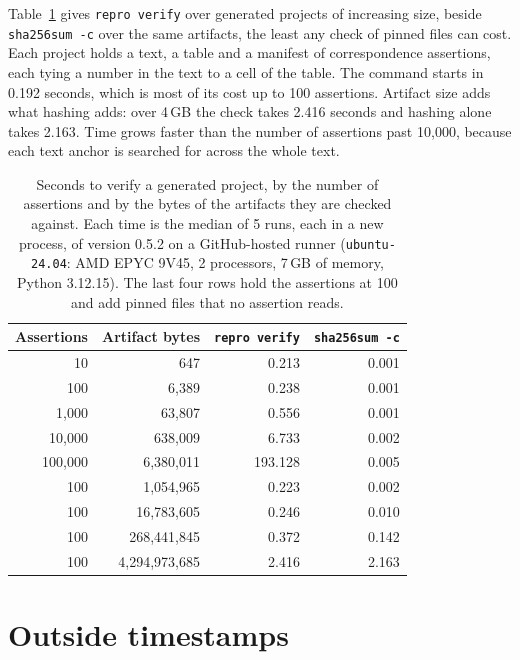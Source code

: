 \documentclass{article}
\newcommand{\code}[1]{\texttt{#1}}
\newcommand{\reproverify}{\code{repro verify}}
\begin{document}
Table~\ref{tab:timing} gives \reproverify{} over generated projects of increasing size, beside
\code{sha256sum -c} over the same artifacts, the least any check of pinned files can cost. Each
project holds a text, a table and a manifest of correspondence assertions, each tying a number in
the text to a cell of the table. The command starts in 0.192 seconds, which is most of its cost
up to 100 assertions. Artifact size adds what hashing adds: over 4\,GB the check takes 2.416
seconds and hashing alone takes 2.163. Time grows faster than the number of assertions past
10{,}000, because each text anchor is searched for across the whole text.

\begin{table}[H]
\centering
\small
\caption{Seconds to verify a generated project, by the number of assertions and by the bytes of
the artifacts they are checked against. Each time is the median of 5 runs, each in a new process,
of version 0.5.2 on a GitHub-hosted runner (\code{ubuntu-24.04}: AMD EPYC 9V45, 2 processors,
7\,GB of memory, Python 3.12.15). The last four rows hold the assertions at 100 and add pinned
files that no assertion reads.}
\label{tab:timing}
\begin{tabular}{@{}rrrr@{}}
\toprule
\textbf{Assertions} & \textbf{Artifact bytes} & \textbf{\reproverify{}} & \textbf{\code{sha256sum -c}} \\
\midrule
10 & 647 & 0.213 & 0.001 \\
100 & 6{,}389 & 0.238 & 0.001 \\
1{,}000 & 63{,}807 & 0.556 & 0.001 \\
10{,}000 & 638{,}009 & 6.733 & 0.002 \\
100{,}000 & 6{,}380{,}011 & 193.128 & 0.005 \\
\midrule
100 & 1{,}054{,}965 & 0.223 & 0.002 \\
100 & 16{,}783{,}605 & 0.246 & 0.010 \\
100 & 268{,}441{,}845 & 0.372 & 0.142 \\
100 & 4{,}294{,}973{,}685 & 2.416 & 2.163 \\
\bottomrule
\end{tabular}
\end{table}



\section{Outside timestamps}
\label{sec:timestamps}
\end{document}
